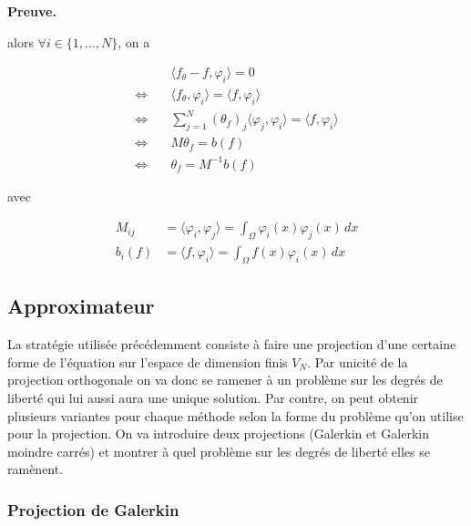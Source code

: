 \documentclass[french]{article}
\newenvironment{preuve}[1][]{\begin{tcolorbox}[
	colback=white, %
	colframe=green!70!black, %
	arc=2mm, %
	boxrule=1pt, %
	breakable, enhanced jigsaw
	]
	\textcolor{green!70!black}{\textbf{Preuve.} \\}

	#1
}{\end{tcolorbox}}
\begin{document}
\begin{enumerate}[label=\textbullet]
\begin{preuve}
			alors $\forall i \in \{1,\dots,N\}$, on a
			
			\begin{align*}
				&\quad \langle f_\theta - f, \varphi_i \rangle = 0 \\
				\iff &\quad \langle f_\theta, \varphi_i \rangle = \langle f, \varphi_i \rangle \quad  \\
				\iff &\quad \sum_{j=1}^N(\theta_f)_j \langle \varphi_j, \varphi_i\rangle = \langle f, \varphi_i \rangle \\ 
				\iff &\quad M \theta_f = b(f) \\
				\iff &\quad \theta_f = M^{-1} b(f)
			\end{align*}
			
			avec 
			
			\begin{align*}
				M_{ij} &= \langle \varphi_i, \varphi_j\rangle = \int_{\Omega} \varphi_i(x) \varphi_j(x) \, dx \\
				b_i(f) &= \langle f, \varphi_i \rangle = \int_{\Omega} f(x) \varphi_i(x) \, dx
			\end{align*}
			
		\end{preuve}
	\end{enumerate}
	
	\subsection{Approximateur}
	
	La stratégie utilisée précédemment consiste à faire une projection d’une certaine forme de l’équation sur l’espace de dimension finis $V_N$. Par unicité de la projection orthogonale on va donc se ramener à un problème sur les degrés de liberté qui lui aussi aura une unique solution. Par contre, on peut obtenir plusieurs variantes pour chaque méthode selon la forme du problème qu’on utilise pour la projection. On va introduire deux projections (Galerkin et Galerkin moindre carrés) et montrer à quel problème sur les degrés de liberté elles se ramènent.
	
	\subsubsection{Projection de Galerkin}
			
\end{document}
